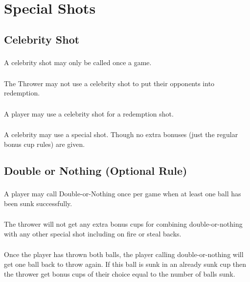 \section{Special Shots}\label{sec:SpecialShots}

	\subsection{Celebrity Shot}\label{ssec:CelebShot}
		\subsubsection{}\label{sssec:CelebShot,number}
			A celebrity shot may only be called once a game.
		\subsubsection{}\label{sssec:CelebShot,finalcup}
			The Thrower may not use a celebrity shot to put their opponents into redemption.
		\subsubsection{}\label{sssec:CelebShot,redemption}
			A player may use a celebrity shot for a redemption shot.
		\subsubsection{}\label{sssec:Celeb,special}
			A celebrity may use a special shot. Though no extra bonuses (just the regular bonus cup rules) are given.
			
    \subsection{Double or Nothing (Optional Rule)}\label{ssec:Double-or-Nothing}
		\subsubsection{}\label{sssec:DN,calling}
			A player may call Double-or-Nothing once per game when at least one ball has been sunk successfully.
		\subsubsection{}\label{sssec:DN,combo}
			The thrower will not get any extra bonus cups for combining double-or-nothing with any other special shot including on fire or steal backs.
		\subsubsection{}\label{sssec:DN,condition}
			Once the player has thrown both balls, the player calling double-or-nothing will get one ball back to throw again.
            If this ball is sunk in an already sunk cup then the thrower get bonus cups of their choice equal to the number of balls sunk.

